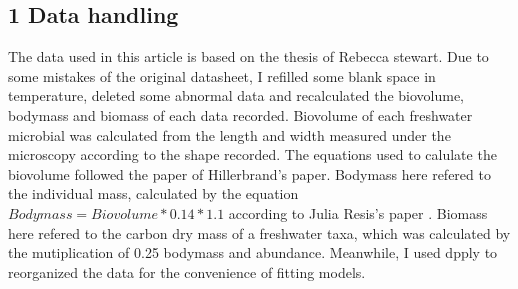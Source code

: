 \documentclass[11pt]{article}
\begin{document}
\begin{linenumbers}
\section*{1 Data handling}
The data used in this article is based on the thesis of Rebecca stewart.
Due to some mistakes of the original datasheet, I refilled some blank space in temperature, deleted some abnormal data and recalculated the biovolume, bodymass and biomass of each data recorded.
Biovolume of each freshwater microbial was calculated from the length and width measured under the microscopy according to the shape recorded.
The equations used to calulate the biovolume followed the paper of Hillerbrand's paper\cite{hillebrand1999biovolume}.
Bodymass here refered to the individual mass, calculated by the equation $Bodymass = Biovolume * 0.14 * 1.1 $ according to Julia Resis's paper \cite{reiss2008existing}.
Biomass here refered to the carbon dry mass of a freshwater taxa, which was calculated by the mutiplication of 0.25 bodymass and abundance.
Meanwhile, I used dpply to reorganized the data for the convenience of fitting models.

\end{linenumbers}
\end{document}
